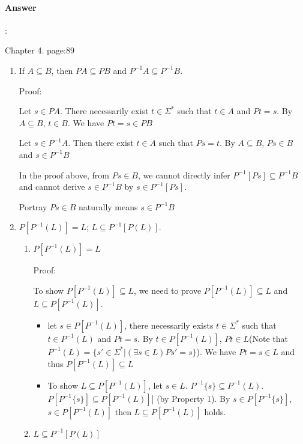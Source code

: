 \documentclass{article}
\begin{document}
\paragraph{Answer}:

Chapter 4. page:89

\begin{enumerate}
  \item If $A \subseteq B$, then $PA \subseteq PB$ and $P^{-1}A \subseteq P^{-1}B$.
  
  Proof:

  Let $s \in PA$. There necessarily exist $t \in \Sigma^*$ such that $t \in A$ and $Pt = s$. By $A \subseteq B$, $t \in B$. We have $Pt = s \in PB$
  
  Let $s \in P^{-1}A$. Then there exist $t \in A$ such that $Ps = t$. By $A \subseteq B$, $Ps \in B$ and $s\in P^{-1}B$

  In the proof above, from $Ps \in B$, we cannot directly infer $P^{-1}[Ps] \subseteq P^{-1}B$ and cannot derive $s \in P^{-1}B$ by $s \in P^{-1}[Ps]$.

  Portray $Ps \in B$ naturally means $s \in P^{-1}B$

  \item $P[P^{-1}(L)] = L$; $L \subseteq P^{-1}[P(L)]$.
  

  \begin{enumerate}
    \item $P[P^{-1}(L)] = L$
    
    Proof:

    To show $P[P^{-1}(L)] \subseteq L$, we need to prove $P[P^{-1}(L)] \subseteq L$ and $L \subseteq P[P^{-1}(L)]$.
  
    \begin{itemize}
      \item let $s \in P[P^{-1}(L)]$, there necessarily exists $t \in \Sigma^*$ such that $t \in P^{-1}(L)$ and $Pt = s$. By $t \in P[P^{-1}(L)]$, $Pt \in L$(Note that $P^{-1}(L) = \{s\prime \in \Sigma^* | (\exists s \in L)Ps\prime = s\}$). We have $Pt = s \in L$ and thus $P[P^{-1}(L)] \subseteq L$
      \item To show $L \subseteq P[P^{-1}(L)]$, let $s \in L$. $P^{-1}\{s\} \subseteq P^{-1}(L)$. $P[P^{-1}\{s\}] \subseteq P[P^{-1}(L)]]$ (by Property 1). By $s \in P[P^{-1}\{s\}]$, $s \in P[P^{-1}(L)]$ then $L \subseteq P[P^{-1}(L)]$ holds.
    \end{itemize}
      
    \item $L \subseteq P^{-1}[P(L)]$
    

\end{enumerate}
\end{enumerate}
\end{document}
